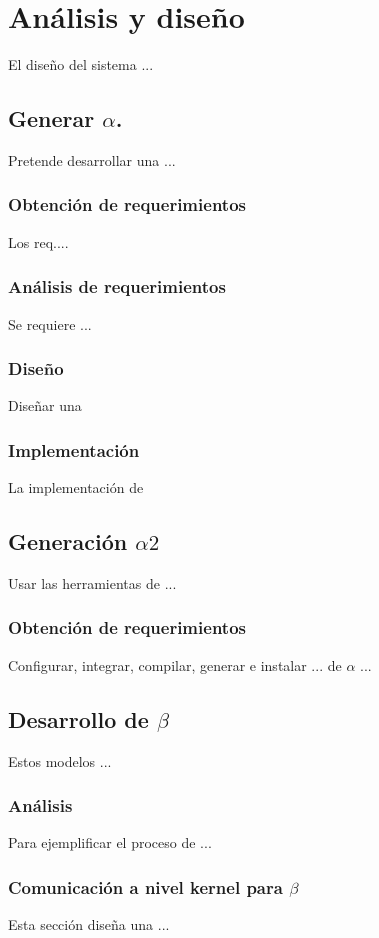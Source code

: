 \chapter{Análisis y diseño}%
El diseño del sistema\cite{MDE93} ...


\section{Generar $\alpha$.}
Pretende desarrollar una ...

\subsection{Obtención de requerimientos}
Los req....

\subsection{Análisis de requerimientos}
Se requiere ...

\subsection{Diseño}
Diseñar una 


\subsection{Implementación}
La implementación de 

\section{Generación $\alpha 2$}
Usar las herramientas de ...

\subsection{Obtención de requerimientos}
Configurar, integrar, compilar, generar e instalar ... de $\alpha$ ...



\section{Desarrollo de $\beta$}
Estos modelos ...

\subsection{Análisis}
Para ejemplificar el proceso de ...

\subsection{Comunicación a nivel kernel para $\beta$}
Esta sección diseña una ...

